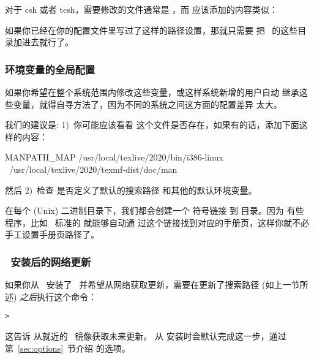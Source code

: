 \documentclass{article}
\begin{document}
对于 csh 或者 tcsh，需要修改的文件通常是 ，而
应该添加的内容类似：


如果你已经在你的配置文件里写过了这样的路径设置，那就只需要
把 \TL\ 的这些目录加进去就行了。

\subsubsection{环境变量的全局配置}
\label{sec:envglobal}

如果你希望在整个系统范围内修改这些变量，或这样系统新增的用户自动
继承这些变量，就得自寻方法了，因为不同的系统之间这方面的配置差异
太大。

我们的建议是: 1)~你可能应该看看 
这个文件是否存在，如果有的话，添加下面这样的内容：

\begin{sverbatim}
MANPATH_MAP /usr/local/texlive/2020/bin/i386-linux \
            /usr/local/texlive/2020/texmf-dist/doc/man
\end{sverbatim}

然后 2)~检查  是否定义了默认的搜索路径
和其他的默认环境变量。

在每个 (Unix) 二进制目录下，我们都会创建一个  符号链接
到  目录。因为
有些 \code{man} 程序，比如 \MacOSX\ 标准的  就能够自动通
过这个链接找到对应的手册页，这样你就不必手工设置手册页路径了。

\subsubsection{\DVD\ 安装后的网络更新}
\label{sec:dvd-install-net-updates}

如果你从 \DVD\ 安装了 \TL\ 并希望从网络获取更新，需要在更新了搜索路径
(如上一节所述) \emph{之后}执行这个命令：

\begin{alltt}
> 
\end{alltt}

这告诉  从就近的 \CTAN\ 镜像获取未来更新。
从 \DVD{} 安装时会默认完成这一步，通过第~\ref{sec:options}~节介绍
的选项。
\end{document}

